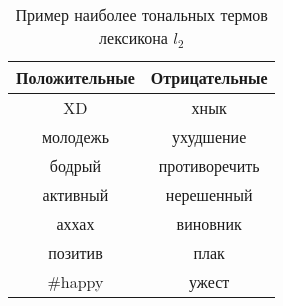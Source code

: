 \begin{table}[htp!]
\centering
\caption{Пример наиболее тональных термов лексикона $l_2$}
\label{table:jan_lexicon}
\begin{tabular}{cc}
\hline
\multicolumn{1}{c|}{Положительные} & \multicolumn{1}{c}{Отрицательные} \\ \hline
XD                                 & хнык                               \\
молодежь                           & ухудшение                          \\
бодрый                             & противоречить                      \\
активный                           & нерешенный                         \\
аххах                              & виновник                           \\
позитив                            & плак                               \\
\#happy                            & ужест                              \\ \hline
\end{tabular}
\end{table}
